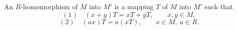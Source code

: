 An $R$-homomorphism of $M$ into $M'$ is a mapping $T$ of $M$ into $M'$ such that
$$
(1)\quad (x + y)T = xT + yT, \qquad x, y \in M,
$$
$$
(2)\quad (ax)T = a(xT), \qquad x \in M,\ a \in R.
$$
